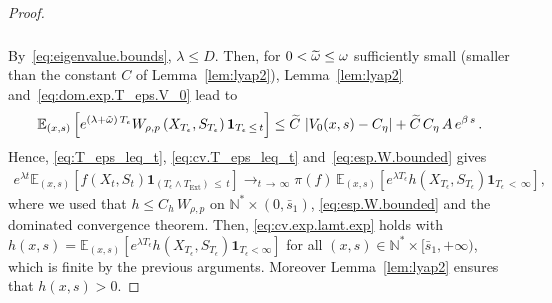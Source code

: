 \documentclass[10pt]{amsart}
\theoremstyle{definition}\newtheorem{defi}[theo]{Definition}\newtheorem{rema}[theo]{Remark}\newtheorem{exam}[theo]{Example}\newtheorem{exem}[theo]{Example}\newtheorem{nota}[theo]{Notation}
\newcommand{\NN}{\mathbb{N}}
\newcommand{\EE}{\mathbb{E}}
\newcommand{\Text}{T_{\mathrm{Ext}}}
\newcommand{\1}{\mathbf{1}}
\let\oldtilde\tilde
\renewcommand*{\tilde}[1]{\mathchoice{\widetilde{#1}}{\widetilde{#1}}{\oldtilde{#1}}{\oldtilde{#1}}}
\begin{document}
\begin{proof}
\begin{multline}
\begin{aligned}
\end{aligned}
\end{multline}
By~\eqref{eq:eigenvalue.bounds}, $\lambda \leq D$. Then, for $0<\tilde \omega\leq \omega$ sufficiently small (smaller than the constant $C$ of Lemma~\ref{lem:lyap2}), Lemma~\ref{lem:lyap2} and~\eqref{eq:dom.exp.T_eps.V_0} lead to
\begin{align}\label{eq:esp.W.bounded}
\EE_{(x,s)} \left[e^{\left(\lambda+\tilde\omega\right)\, T_\epsilon}W_{\rho,p}\left(X_{T_\epsilon},S_{T_\epsilon}\right) \1_{T_\epsilon\,\leq\,t} \right]
\leq \tilde C\,\left|V_0(x,s)-C_\eta\right| +\tilde C\,C_\eta\, A\,e^{\beta\,s}\,.
\end{align}
Hence, \eqref{eq:T_eps_leq_t}, \eqref{eq:cv.T_eps_leq_t} and~\eqref{eq:esp.W.bounded} gives
\begin{align*}
e^{\lambda t}\EE_{(x,s)} \left[f(X_t,S_t)\1_{\left(T_\epsilon\wedge \Text\right)\,\leq\,t}\right]
\longrightarrow_{t\,\to\,\infty} \pi(f) \,\EE_{(x,s)} \left[e^{\lambda T_\epsilon} h\left(X_{T_\epsilon},S_{T_\epsilon}\right) \1_{T_\epsilon\,<\,\infty}\right],
\end{align*}
where we used that $h\leq C_h\, W_{\rho,p}$ on $\NN^*\times (0,\bar s_1)$, \eqref{eq:esp.W.bounded} and the dominated convergence theorem. Then, \eqref{eq:cv.exp.lamt.exp} holds with $h(x,s)=\EE_{(x,s)} [e^{\lambda T_\epsilon} h(X_{T_\epsilon},S_{T_\epsilon}) \1_{T_\epsilon < \infty}]$ for all $(x,s) \in \NN^* \times [\bar s_1,+\infty)$, which is finite by the previous arguments. Moreover Lemma~\ref{lem:lyap2} ensures that $h(x,s)>0$.




\end{proof}
\end{document}
